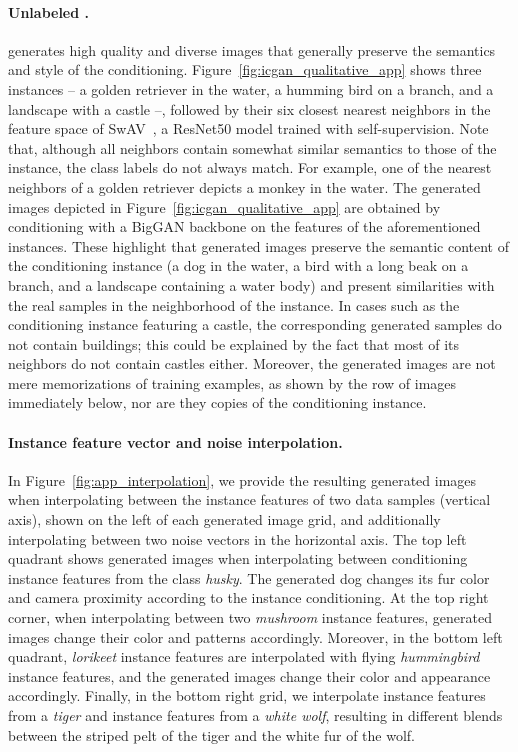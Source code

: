 \paragraph{Unlabeled \ImNet.} \ours generates high quality and diverse images that generally preserve the semantics and style of the conditioning. Figure~\ref{fig:icgan_qualitative_app} shows three instances -- a golden retriever in the water, a humming bird on a branch, and a landscape with a castle --, followed by their six closest nearest neighbors in the feature space of SwAV~\cite{caron2020unsupervised}, a ResNet50 model trained with self-supervision. 
Note that, although all neighbors contain somewhat similar semantics to those of the instance, the class labels do not always match. For example, one of the nearest neighbors of a golden retriever depicts a monkey in the water. The generated images depicted in Figure~\ref{fig:icgan_qualitative_app} are obtained by conditioning \ours with a BigGAN backbone on the features of the aforementioned instances. These highlight that generated images preserve the semantic content of the conditioning instance (a dog in the water, a bird with a long beak on a branch, and a landscape containing a water body) and present similarities with the real samples in the neighborhood of the instance. In cases such as the conditioning instance featuring a castle, the corresponding generated samples do not contain buildings; this could be explained by the fact that most of its neighbors do not contain castles either. Moreover, the generated images are not mere memorizations of training examples, as shown by the row of images immediately below, nor are they copies of the conditioning instance. 

\paragraph{Instance feature vector and noise interpolation.} In Figure~\ref{fig:app_interpolation}, we provide the resulting generated images when interpolating between the instance features of two data samples (vertical axis), shown on the left of each generated image grid, and additionally interpolating between two noise vectors in the horizontal axis. The top left quadrant shows generated images when interpolating between conditioning instance features from the class \textit{husky}. The generated dog changes its fur color and camera proximity according to the instance conditioning. At the top right corner, when interpolating between two \textit{mushroom} instance features, generated images change their color and patterns accordingly. Moreover, in the bottom left quadrant, \textit{lorikeet} instance features are interpolated with flying \textit{hummingbird} instance features, and the generated images change their color and appearance accordingly. Finally, in the bottom right grid, we interpolate instance features from a \textit{tiger} and instance features from a \textit{white wolf}, resulting in different blends between the striped pelt of the tiger and the white fur of the wolf. 

